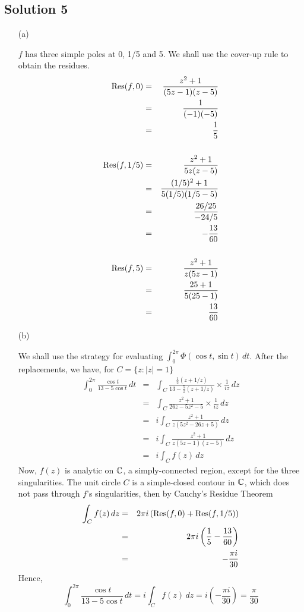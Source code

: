 \subsection*{Solution 5}

\begin{itemize}
\item[(a)]

$f$ has three simple poles at 0, 1/5 and 5. We shall use the cover-up
rule to obtain the residues.
\begin{eqnarray*}
{\rm Res}(f, 0)
	&=& \frac{ z^2+1 }{ (5z-1)(z-5) } \\
	&=& \frac{1}{(-1)(-5)} \\
	&=& \frac{1}{5} \\
\\
{\rm Res}(f, 1/5)
	&=& \frac{ z^2+1 }{ 5z(z-5) } \\
	&=& \frac{ (1/5)^2+1 }{ 5(1/5)(1/5-5) } \\
	&=& \frac{ 26/25 }{ -24/5 } \\
	&=& -\frac{13}{60} \\
\\
{\rm Res}(f, 5)
	&=& \frac{ z^2+1 }{ z(5z-1) } \\
	&=& \frac{ 25+1 }{ 5(25-1) } \\
	&=& \frac{13}{60}
\end{eqnarray*}

\item[(b)]

We shall use the strategy for evaluating
$\int_0^{2\pi}\Phi(\cos t, \sin t)\,dt$.
After the replacements, we have, for $C=\{z:|z|=1\}$
\begin{eqnarray*}
\int_0^{2\pi} \frac{ \cos t }{ 13-5\cos t }\,dt
	&=& \int_C \frac{ \frac{1}{2}(z+1/z) }{ 13-\frac{5}{2}(z+1/z) } \times \frac{1}{iz}\,dz \\
	&=& \int_C \frac{ z^2+1 }{ 26z-5z^2-5 } \times \frac{1}{iz}\,dz \\
	&=& i \int_C \frac{ z^2+1 }{ z(5z^2-26z+5) }\,dz \\
	&=& i \int_C \frac{ z^2+1 }{ z(5z-1)(z-5) }\,dz \\
	&=& i \int_C f(z)\,dz
\end{eqnarray*}
Now, $f(z)$ is analytic on $\mathbb{C}$, a simply-connected region,
except for the three singularities. The unit circle $C$ is a
simple-closed contour in $\mathbb{C}$, which does not pass through $f$'s
singularities, then by Cauchy's Residue Theorem
\begin{eqnarray*}
\int_C f(z)\,dz
	&=& 2\pi i\left({\rm Res}(f,0)+{\rm Res}(f,1/5)\right) \\
	&=& 2\pi i\left(\frac{1}{5}-\frac{13}{60}\right) \\
	&=& -\frac{\pi i}{30}
\end{eqnarray*}
Hence,
\[
\int_0^{2\pi} \frac{ \cos t }{ 13-5\cos t }\,dt
	= i \int_C f(z)\,dz
	= i \left( -\frac{\pi i}{30} \right)
	= \frac{\pi}{30}
\]

\end{itemize}

